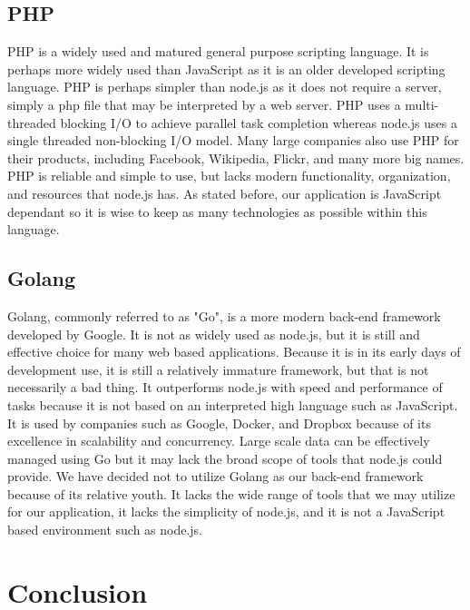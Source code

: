\documentclass[onecolumn, draftclsnofoot,10pt, compsoc]{IEEEtran}
\begin{document}
	\subsection{PHP}
	
		PHP is a widely used and matured general purpose scripting language. It is perhaps more widely used than JavaScript as it is an older developed scripting language. PHP is perhaps
		simpler than node.js as it does not require a server, simply a php file that may be interpreted by a web server. PHP uses a multi-threaded blocking I/O to achieve parallel task 
		completion whereas node.js uses a single threaded non-blocking I/O model. Many large companies also use PHP for their products, including Facebook, Wikipedia, Flickr, and many
		more big names. PHP is reliable and simple to use, but lacks modern functionality, organization, and resources that node.js has. As stated before, our application is JavaScript
		dependant so it is wise to keep as many technologies as possible within this language.
	
	\subsection{Golang}
	
		Golang, commonly referred to as "Go", is a more modern back-end framework developed by Google. It is not as widely used as node.js, but it is still and effective choice 
		for many web based applications. Because it is in its early days of development use, it is still a relatively immature framework, but that is not necessarily a bad thing.
		It outperforms node.js with speed and performance of tasks because it is not based on an interpreted high language such as JavaScript. It is used by companies such as Google, 
		Docker, and Dropbox because of its excellence in scalability and concurrency. Large scale data can be effectively managed using Go but it may lack the broad scope of 
		tools that node.js could provide. We have decided not to utilize Golang as our back-end framework because of its relative youth. It lacks the wide range of tools that we may
		utilize for our application, it lacks the simplicity of node.js, and it is not a JavaScript based environment such as node.js. 
	

\section{Conclusion}
\end{document}

